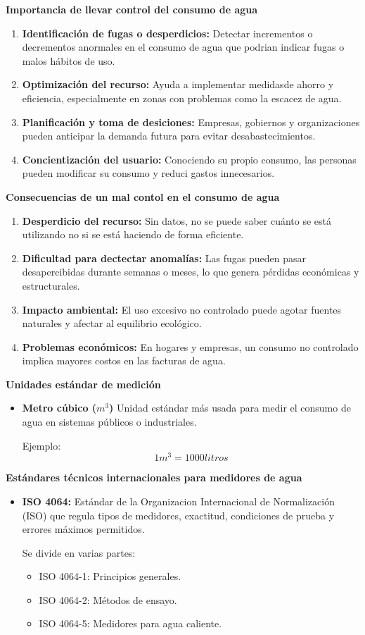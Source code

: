 \documentclass[12pt,a4paper]{report}
\begin{document}
\textbf{Importancia de llevar control del consumo de agua}
\begin{enumerate}
  \item \textbf{Identificación de fugas o desperdicios:} Detectar incrementos o decrementos anormales en el consumo de agua que podrian indicar fugas o malos hábitos de uso.
  \item \textbf{Optimización del recurso:} Ayuda a implementar medidasde ahorro y eficiencia, especialmente en zonas con problemas como la escacez de agua.
  \item \textbf{Planificación y toma de desiciones:} Empresas, gobiernos y organizaciones pueden anticipar la demanda futura para evitar desabastecimientos.
  \item \textbf{Concientización del usuario:} Conociendo su propio consumo, las personas pueden modificar su consumo y reduci gastos innecesarios.
\end{enumerate}
\cite{rojas2002guia}

\textbf{Consecuencias de un mal contol en el consumo de agua}
\begin{enumerate}
  \item \textbf{Desperdicio del recurso:} Sin datos, no se puede saber cuánto se está utilizando no si se está haciendo de forma eficiente.
  \item \textbf{Dificultad para dectectar anomalías:} Las fugas pueden pasar desapercibidas durante semanas o meses, lo que genera pérdidas económicas y estructurales.
  \item \textbf{Impacto ambiental:} El uso excesivo no controlado puede agotar fuentes naturales y afectar al equilibrio ecológico.
  \item \textbf{Problemas económicos:} En hogares y empresas, un consumo no controlado implica mayores costos en las facturas de agua.
\end{enumerate}

\textbf{Unidades estándar de medición}
\begin{itemize}
  \item \textbf{Metro cúbico ($m^{3}$)}
  Unidad estándar más usada para medir el consumo de agua en sistemas públicos o industriales.

  Ejemplo: 
  \[1 m^{3} = 1000 litros\]
\end{itemize}

\textbf{Estándares técnicos internacionales para medidores de agua}
\begin{itemize}
  \item \textbf{ISO 4064:}
  Estándar de la Organizacion Internacional de Normalización (ISO) que regula tipos de medidores, exactitud, condiciones de prueba y errores máximos permitidos.
  
  Se divide en varias partes:
  \begin{itemize}
    \item ISO 4064-1: Principios generales.
    \item ISO 4064-2: Métodos de ensayo.
    \item ISO 4064-5: Medidores para agua caliente.
  \end{itemize}
\end{itemize}
\end{document}
